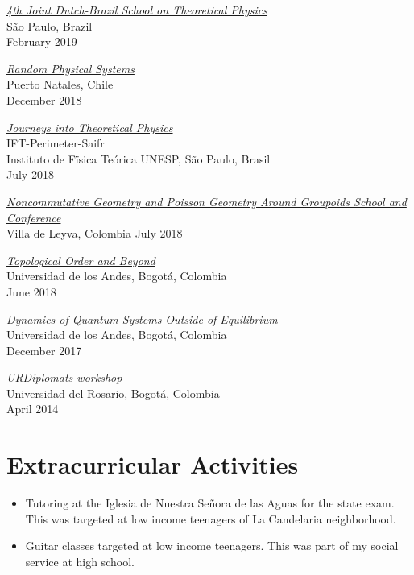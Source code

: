 \documentclass[line,margin]{res}
\begin{document}
\begin{resume}
\href{http://www.ictp-saifr.org/4th-joint-dutch-brazil-school-on-theoretical-physics/}{\sl 4th Joint Dutch-Brazil School on Theoretical Physics}\\
São Paulo, Brazil\\
February 2019

\href{http://eventos.cmm.uchile.cl/rps-patagonia2018/}{\sl Random Physical Systems}\\
Puerto Natales, Chile\\
December 2018

{\sl \href{http://journeys.ictp-saifr.org/journeys-2018/}{Journeys into Theoretical Physics}}\\
IFT-Perimeter-Saifr\\
Instituto de Fïsica Teórica UNESP, São Paulo, Brasil\\
July 2018

{\sl \href{https://ncgandpoisson2018.wordpress.com/}{Noncommutative Geometry and Poisson Geometry Around Groupoids School and Conference}}\\
Villa de Leyva, Colombia
July 2018

{\sl \href{https://matematicas.uniandes.edu.co/~cursillo_gr/escuela2018/}{Topological Order and Beyond}}\\
Universidad de los Andes, Bogotá, Colombia\\
June 2018

\href{https://fisica.uniandes.edu.co/profesores/anreyes/es/cursillo/}{\sl Dynamics of Quantum Systems Outside of Equilibrium} \\
Universidad de los Andes, Bogotá, Colombia\\
December 2017

{\sl URDiplomats workshop} \\
Universidad del Rosario, Bogotá, Colombia \\
April 2014  
 
\section{Extracurricular Activities}

\begin{itemize}

\item Tutoring at the Iglesia de Nuestra Señora de las Aguas for the state exam. This was targeted at low income teenagers of La Candelaria neighborhood. 

\item Guitar classes targeted at low income teenagers. This was part of my social service at high school.


\end{itemize}
\end{resume}
\end{document}
